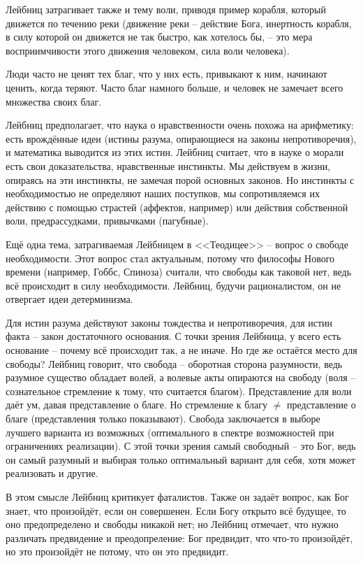 \documentclass[a4paper, 12pt]{book} %
\begin{document}
Лейбниц затрагивает также и тему воли, приводя пример корабля, который движется по течению реки (движение реки -- действие Бога, инертность корабля, в силу которой он движется не так быстро, как хотелось бы, -- это мера восприимчивости этого движения человеком, сила воли человека).

Люди часто не ценят тех благ, что у них есть, привыкают к ним, начинают ценить, когда теряют. Часто благ намного больше, и человек не замечает всего множества своих благ.

Лейбниц предполагает, что наука о нравственности очень похожа на арифметику: есть врождённые идеи (истины разума, опирающиеся на законы непротиворечия), и математика выводится из этих истин. Лейбниц считает, что в науке о морали есть свои доказательства, нравственные инстинкты. Мы действуем в жизни, опираясь на эти инстинкты, не замечая порой основных законов. Но инстинкты с необходимостью не определяют наших поступков, мы сопротивляемся их действию с помощью страстей (аффектов, например) или действия собственной воли, предрассудками, привычками (пагубные).

Ещё одна тема, затрагиваемая Лейбницем в <<Теодицее>> -- вопрос о свободе необходимости. Этот вопрос стал актуальным, потому что философы Нового времени (например, Гоббс, Спиноза) считали, что свободы как таковой нет, ведь всё происходит в силу необходимости. Лейбниц, будучи рационалистом, он не отвергает идеи детерминизма.

Для истин разума действуют законы тождества и непротиворечия, для истин факта -- закон достаточного основания. С точки зрения Лейбница, у всего есть основание -- почему всё происходит так, а не иначе.  Но где же остаётся место для свободы? Лейбниц говорит, что свобода -- оборотная сторона разумности, ведь разумное существо обладает волей, а волевые акты опираются на свободу (воля -- сознательное стремление к тому, что считается благом). Представление для воли даёт ум, давая представление о благе. Но стремление к благу $\neq$ представление о благе (представления только показывают). Свобода заключается в выборе лучшего варианта из возможных (оптимального в спектре возможностей при ограничениях реализации). С этой точки зрения самый свободный -- это Бог, ведь он самый разумный и выбирая только оптимальный вариант для себя, хотя может реализовать и другие.

В этом смысле Лейбниц критикует фаталистов. Также он задаёт вопрос, как Бог знает, что произойдёт, если он совершенен. Если Богу открыто всё будущее, то оно предопределено и свободы никакой нет; но Лейбниц отмечает, что нужно различать предвидение и преодопреление: Бог предвидит, что что-то произойдёт, но это произойдёт не потому, что он это предвидит. 
\end{document}
